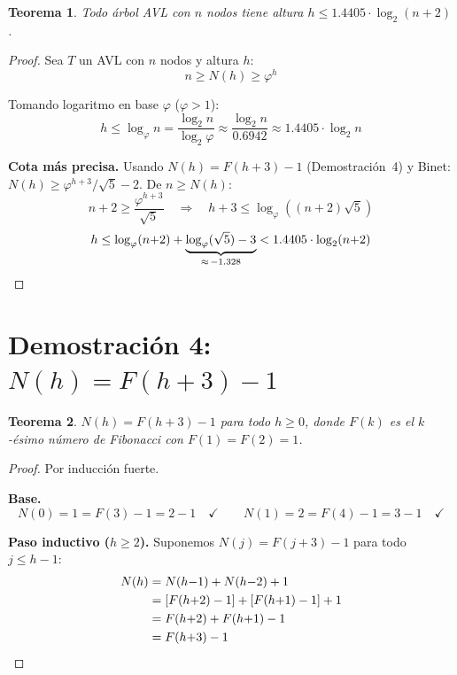 \documentclass[11pt, letterpaper]{article}
\theoremstyle{definition}
\theoremstyle{plain}
\newtheorem{theorem}{Teorema}[section]
\theoremstyle{remark}
\begin{document}
\begin{theorem}\label{thm:height}
Todo árbol AVL con $n$ nodos tiene altura
$h \leq 1.4405 \cdot \log_2(n+2)$.
\end{theorem}

\begin{proof}
Sea $T$ un AVL con $n$ nodos y altura $h$:
\[
  n \geq N(h) \geq \varphi^h
\]

Tomando logaritmo en base $\varphi$ ($\varphi > 1$):
\[
  h \leq \log_\varphi n
  = \frac{\log_2 n}{\log_2 \varphi}
  \approx \frac{\log_2 n}{0.6942}
  \approx 1.4405 \cdot \log_2 n
\]

\textbf{Cota más precisa.} Usando $N(h) = F(h{+}3) - 1$
(Demostración~4) y Binet: $N(h) \geq \varphi^{h+3}/\sqrt{5} - 2$.
De $n \geq N(h)$:
\[
  n + 2 \geq \frac{\varphi^{h+3}}{\sqrt{5}}
  \quad\Longrightarrow\quad
  h + 3 \leq \log_\varphi\!\left((n{+}2)\sqrt{5}\right)
\]
\[
  h \leq \log_\varphi(n{+}2) + \underbrace{\log_\varphi(\sqrt{5}) - 3}_{\approx\, -1.328}
  < 1.4405 \cdot \log_2(n{+}2) \qedhere
\]
\end{proof}

\section{Demostración 4: \texorpdfstring{$N(h) = F(h+3) - 1$}{N(h) = F(h+3) - 1}}

\begin{theorem}\label{thm:fib}
$N(h) = F(h+3) - 1$ para todo $h \geq 0$, donde
$F(k)$ es el $k$-ésimo número de Fibonacci con $F(1)=F(2)=1$.
\end{theorem}

\begin{proof}
Por inducción fuerte.

\textbf{Base.}
\[
  N(0) = 1 = F(3) - 1 = 2 - 1 \quad \checkmark
  \qquad
  N(1) = 2 = F(4) - 1 = 3 - 1 \quad \checkmark
\]

\textbf{Paso inductivo ($h \geq 2$).} Suponemos
$N(j) = F(j{+}3) - 1$ para todo $j \leq h{-}1$:
\begin{align*}
  N(h) &= N(h{-}1) + N(h{-}2) + 1 \\
       &= [F(h{+}2) - 1] + [F(h{+}1) - 1] + 1 \\
       &= F(h{+}2) + F(h{+}1) - 1 \\
       &= F(h{+}3) - 1 \qedhere
\end{align*}
\end{proof}
\end{document}
